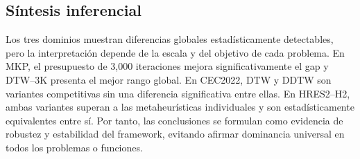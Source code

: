 \subsection{S\'intesis inferencial}
\label{sec:sintesis-estadistica-es}

Los tres dominios muestran diferencias globales estad\'isticamente detectables,
pero la interpretaci\'on depende de la escala y del objetivo de cada problema.
En MKP, el presupuesto de 3,000 iteraciones mejora significativamente el gap y
DTW--3K presenta el mejor rango global. En CEC2022, DTW y DDTW son variantes
competitivas sin una diferencia significativa entre ellas. En HRES2--H2, ambas
variantes superan a las metaheur\'isticas individuales y son estad\'isticamente
equivalentes entre s\'i. Por tanto, las conclusiones se formulan como evidencia
de robustez y estabilidad del framework, evitando afirmar dominancia universal
en todos los problemas o funciones.
